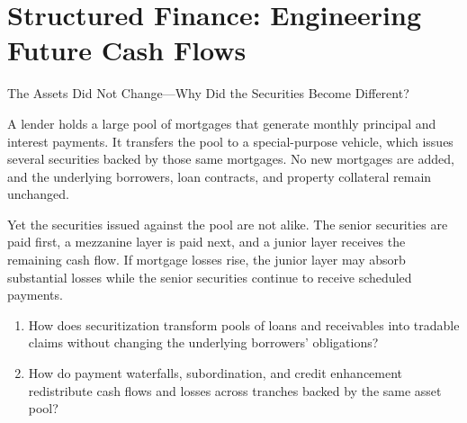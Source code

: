 \chapter{Structured Finance: Engineering Future Cash Flows}
\label{chap:Structured_Finance_Engineering_Future_Cash_Flows}

\begin{openingcase}{The Assets Did Not Change---Why Did the Securities Become Different?}

A lender holds a large pool of mortgages that generate monthly principal and interest payments. It transfers the pool to a special-purpose vehicle, which issues several securities backed by those same mortgages. No new mortgages are added, and the underlying borrowers, loan contracts, and property collateral remain unchanged.

Yet the securities issued against the pool are not alike. The senior securities are paid first, a mezzanine layer is paid next, and a junior layer receives the remaining cash flow. If mortgage losses rise, the junior layer may absorb substantial losses while the senior securities continue to receive scheduled payments.

\end{openingcase}

\begin{tcolorbox}[
  enhanced,
  colback=FinanceBlue!6,
  colframe=FinanceBlue,
  boxrule=0.6pt,
  sharp corners,
  left=8pt,
  right=8pt,
  top=7pt,
  bottom=7pt,
  before skip=1em,
  after skip=1.6em,
  title=\textbf{Core Questions},
  coltitle=white,
  colbacktitle=FinanceBlue,
  fonttitle=\bfseries,
  attach boxed title to top left={xshift=6pt,yshift=-2mm},
  boxed title style={
    boxrule=0pt,
    sharp corners,
    left=5pt,
    right=5pt,
    top=2pt,
    bottom=2pt
  }
]
\begin{enumerate}[
  leftmargin=*,
  label=\textcolor{FinanceBlue}{\textbf{\arabic*.}},
  itemsep=0.55em,
  topsep=0.2em
]

\item How does securitization transform pools of loans and receivables into tradable claims without changing the underlying borrowers' obligations?

\item How do payment waterfalls, subordination, and credit enhancement redistribute cash flows and losses across tranches backed by the same asset pool?

\end{enumerate}
\end{tcolorbox}


